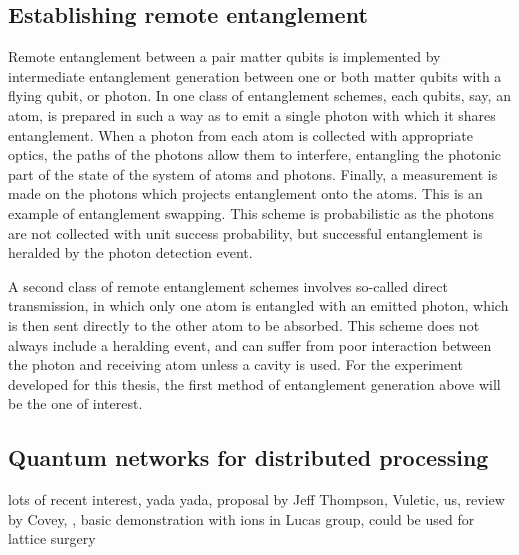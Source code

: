 \subsection{Establishing remote entanglement}\label{sec:reg}

Remote entanglement between a pair matter qubits is implemented by intermediate entanglement generation between one or both matter qubits with a flying qubit, or photon. In one class of entanglement schemes, each qubits, say, an atom, is prepared in such a way as to emit a single photon with which it shares entanglement. When a photon from each atom is collected with appropriate optics, the paths of the photons allow them to interfere, entangling the photonic part of the state of the system of atoms and photons. Finally, a measurement is made on the photons which projects entanglement onto the atoms. This is an example of entanglement swapping\cite{Zukowski1993}. This scheme is probabilistic as the photons are not collected with unit success probability, but successful entanglement is heralded by the photon detection event.

A second class of remote entanglement schemes involves so-called direct transmission, in which only one atom is entangled with an emitted photon, which is then sent directly to the other atom to be absorbed. This scheme does not always include a heralding event, and can suffer from poor interaction between the photon and receiving atom unless a cavity is used. For the experiment developed for this thesis, the first method of entanglement generation above will be the one of interest.

\subsection{Quantum networks for distributed processing}

lots of recent interest, yada yada, proposal by Jeff Thompson, Vuletic, us, review by Covey, \cite{Thompson2024, sinclair2024, Covey2023, Young2022}, basic demonstration with ions in Lucas group, could be used for lattice surgery \cite{Horsman2012}

